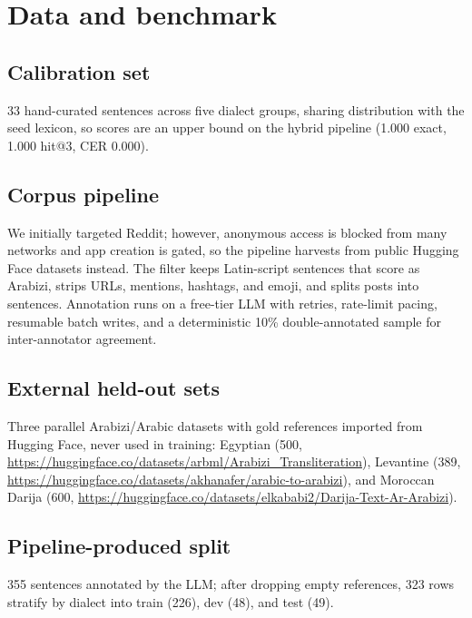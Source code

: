 \documentclass[11pt]{article}
\begin{document}
\section{Data and benchmark}
\label{sec:data}

\subsection{Calibration set}
\label{sec:calibration}

33 hand-curated sentences across five dialect groups, sharing
distribution with the seed lexicon, so scores are an upper bound on the
hybrid pipeline (1.000 exact, 1.000 hit@3, CER 0.000).

\subsection{Corpus pipeline}
\label{sec:pipeline}

We initially targeted Reddit; however, anonymous access is blocked from
many networks and app creation is gated, so the pipeline harvests from
public Hugging Face datasets instead. The filter keeps Latin-script
sentences that score as Arabizi, strips URLs, mentions, hashtags, and
emoji, and splits posts into sentences. Annotation runs on a free-tier
LLM with retries, rate-limit pacing, resumable batch writes, and a
deterministic 10\% double-annotated sample for inter-annotator agreement.

\subsection{External held-out sets}
\label{sec:external}

Three parallel Arabizi/Arabic datasets with gold references imported
from Hugging Face, never used in training: Egyptian (500,
\url{https://huggingface.co/datasets/arbml/Arabizi_Transliteration}),
Levantine (389, \url{https://huggingface.co/datasets/akhanafer/arabic-to-arabizi}),
and Moroccan Darija (600, \url{https://huggingface.co/datasets/elkababi2/Darija-Text-Ar-Arabizi}).

\subsection{Pipeline-produced split}
\label{sec:split}

355 sentences annotated by the LLM; after dropping empty references, 323
rows stratify by dialect into train (226), dev (48), and test (49).
\end{document}
